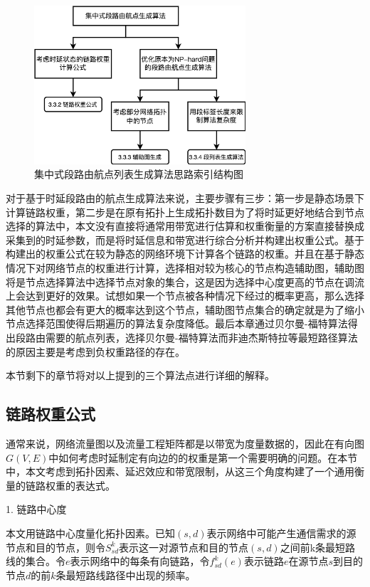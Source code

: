 \begin{figure}[htbp]
\setlength{\abovecaptionskip}{15pt plus 3pt minus 2pt}
\centerline{\includegraphics[width=0.7\textwidth]{./figures/ch3-ark.png}}
\caption{集中式段路由航点列表生成算法思路索引结构图}
\label{fig-ch3-ark}
\end{figure}

对于基于时延段路由的航点生成算法来说，主要步骤有三步：第一步是静态场景下计算链路权重，第二步是在原有拓扑上生成拓扑数目为了将时延更好地结合到节点选择的算法中，本文没有直接将通常用带宽进行估算和权重衡量的方案直接替换成采集到的时延参数，而是将时延信息和带宽进行综合分析并构建出权重公式。基于构建出的权重公式在较为静态的网络环境下计算各个链路的权重。并且在基于静态情况下对网络节点的权重进行计算，选择相对较为核心的节点构造辅助图，辅助图将是节点选择算法中选择节点对象的集合，这是因为选择中心度更高的节点在调流上会达到更好的效果。试想如果一个节点被各种情况下经过的概率更高，那么选择其他节点也都会有更大的概率达到这个节点，辅助图节点集合的确定就是为了缩小节点选择范围使得后期遍历的算法复杂度降低。最后本章通过贝尔曼-福特算法得出段路由需要的航点列表，选择贝尔曼-福特算法而非迪杰斯特拉等最短路径算法的原因主要是考虑到负权重路径的存在。

本节剩下的章节将对以上提到的三个算法点进行详细的解释。

\subsection{链路权重公式}

通常来说，网络流量图以及流量工程矩阵都是以带宽为度量数据的，因此在有向图$G(V, E)$中如何考虑时延制定有向边的的权重是第一个需要明确的问题。在本节中，本文考虑到拓扑因素、延迟效应和带宽限制，从这三个角度构建了一个通用衡量的链路权重的表达式。

1. 链路中心度

本文用链路中心度量化拓扑因素。已知$(s,d)$表示网络中可能产生通信需求的源节点和目的节点，则令$S_{sd}^k$表示这一对源节点和目的节点$(s,d)$之间前k条最短路线的集合。令$e$表示网络中的每条有向链路，令$f_{sd}^k(e)$表示链路$e$在源节点$s$到目的节点$d$的前$k$条最短路线路径中出现的频率。


